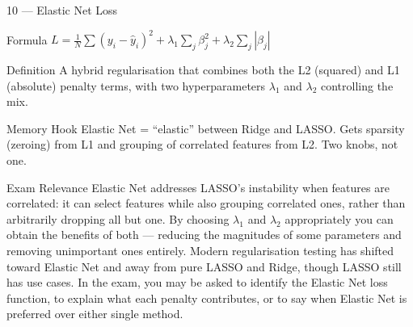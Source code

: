 \documentclass[aspectratio=169,8pt]{beamer}
\begin{document}
	\begin{frame}{10 --- Elastic Net Loss}
		\begin{block}{Formula}
			$L = \frac{1}{N}\sum(y_i - \hat{y}_i)^2 + \lambda_1\sum_j \beta_j^2 + \lambda_2\sum_j |\beta_j|$
		\end{block}
		\begin{block}{Definition}
			A hybrid regularisation that combines both the L2 (squared) and L1 (absolute) penalty terms, with two hyperparameters $\lambda_1$ and $\lambda_2$ controlling the mix.
		\end{block}
		\begin{block}{Memory Hook}
			Elastic Net = ``elastic'' between Ridge and LASSO. Gets sparsity (zeroing) from L1 and grouping of correlated features from L2. Two knobs, not one.
		\end{block}
		\begin{block}{Exam Relevance}
			Elastic Net addresses LASSO's instability when features are correlated: it can select features while also grouping correlated ones, rather than arbitrarily dropping all but one. By choosing $\lambda_1$ and $\lambda_2$ appropriately you can obtain the benefits of both --- reducing the magnitudes of some parameters and removing unimportant ones entirely. Modern regularisation testing has shifted toward Elastic Net and away from pure LASSO and Ridge, though LASSO still has use cases. In the exam, you may be asked to identify the Elastic Net loss function, to explain what each penalty contributes, or to say when Elastic Net is preferred over either single method.
		\end{block}
	\end{frame}
	
\end{document}
